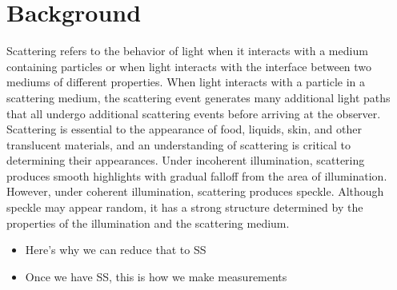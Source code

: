 \section{Background}

Scattering refers to the behavior of light when it interacts with a medium containing particles or when light interacts with the interface between two mediums of different properties. When light interacts with a particle in a scattering medium, the scattering event generates many additional light paths that all undergo additional scattering events before arriving at the observer. Scattering is essential to the appearance of food, liquids, skin, and other translucent materials, and an understanding of scattering is critical to determining their appearances. Under incoherent illumination, scattering produces smooth highlights with gradual falloff from the area of illumination. However, under coherent illumination, scattering produces speckle. Although speckle may appear random, it has a strong structure determined by the properties of the illumination and the scattering medium.

\begin{itemize}
    \item Here's why we can reduce that to SS
    \item Once we have SS, this is how we make measurements
\end{itemize}

